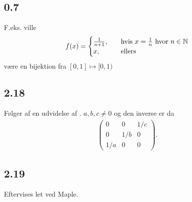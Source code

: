 		\subsection{0.7} 

			F.eks. ville
				\begin{align*}
					f(x)= \begin{cases}
					\frac{1}{n+1}, \quad &\text{hvis $x=\frac{1}{n}$ hvor $n\in \mathbb{N}$}\\
					x, \quad &\text{ellers}
					\end{cases}
				\end{align*} 
			være en bijektion fra $[0,1] \mapsto [0,1)$

		\subsection{2.18}

			Følger af en udvidelse af \cite[Eksempel 0.1.4]{hesselholt2017}. $a,b,c\neq 0$ og den inverse er da 
				\begin{align*}
					\left(\begin{array}{ccc} {0} & {0} & {1/c} \\ {0} & {1/b} & {0} \\ {1/a} & {0} & {0} \end{array}\right).
				\end{align*} 

		\subsection{2.19}

			Eftervises let ved Maple.
